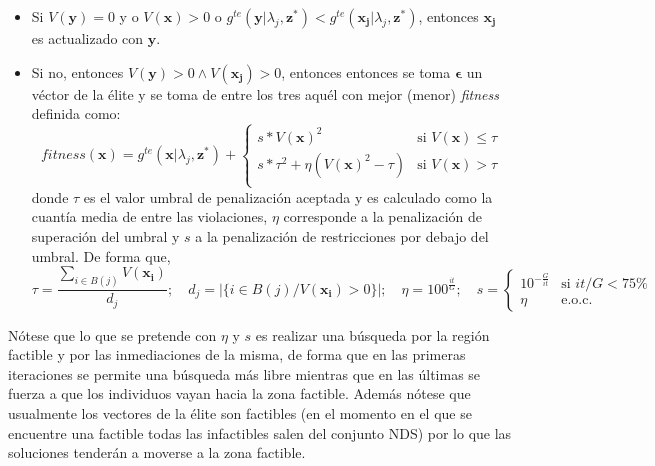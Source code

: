 \begin{enumerate}
    \begin{itemize}
    \item Si $V(\boldsymbol{y})=0$ y   o $V(\boldsymbol{x})>0$ o $g^{te}(\boldsymbol{y} \vert \lambda_j, \boldsymbol{z}^{*}) < g^{te}(\boldsymbol{x_j} \vert \lambda_j, \boldsymbol{z}^{*})$, entonces $\boldsymbol{x_j}$ es actualizado con $\boldsymbol{y}$.\\
    
    \item Si no, entonces $V(\boldsymbol{y})>0 \wedge V(\boldsymbol{x_j})>0$, entonces entonces se toma $\boldsymbol{\epsilon}$ un véctor de la élite y se toma de entre los tres aquél con mejor (menor) \textit{fitness} definida como: $$ fitness(\boldsymbol{x}) = g^{te}(\boldsymbol{x} \vert \lambda_j, \boldsymbol{z}^{*}) + \left\lbrace \begin{array}{cl}
  s*V(\boldsymbol{x})^{2}   & \textrm{si } V(\boldsymbol{x}) \leq \tau \\
  s*\tau^{2} + \eta (V(\boldsymbol{x})^{2} - \tau)   & \textrm{si } V(\boldsymbol{x}) > \tau \\
\end{array} \right. $$ donde $\tau$ es el valor umbral de penalización aceptada y es calculado como la cuantía media de entre las violaciones, $\eta$ corresponde a la penalización de superación del umbral y $s$ a la penalización de restricciones por debajo del umbral. De forma que, $$\tau=\frac{\sum \limits_{i \in B(j)} V(\boldsymbol{x_i})}{d_j}; \quad d_j = |\{i \in B(j)/ V(\boldsymbol{x_i})>0 \}|; \quad \eta=100^{\frac{it}{G}}; \quad s= \left\lbrace \begin{array}{cl} 10^{-\frac{G}{it}} & \textrm{si } it/G < 75\% \\ \eta & \textrm{e.o.c.}\end{array}\right. $$
    \end{itemize}
    
Nótese que lo que se pretende con $\eta$ y $s$ es realizar una búsqueda por la región factible y por las inmediaciones de la misma, de forma que en las primeras iteraciones se permite una búsqueda más libre mientras que en las últimas se fuerza a que los individuos vayan hacia la zona factible. Además nótese que usualmente los vectores de la élite son factibles (en el momento en el que se encuentre una factible todas las infactibles salen del conjunto NDS) por lo que las soluciones tenderán a moverse a la zona factible.\\


\end{enumerate}
